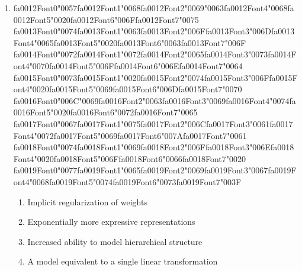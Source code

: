 \documentclass[12pt]{article}
\begin{document}
\begin{enumerate}[label=Q\arabic*.]
 \item {\csname fa0012Font0\endcsname\char"0057}{\csname fa0012Font1\endcsname\char"0068}{\csname fa0012Font2\endcsname\char"0069}{\char"0063}{\csname fa0012Font4\endcsname\char"0068}{\csname fa0012Font5\endcsname\char"0020}{\csname fa0012Font6\endcsname\char"006F}{\csname fa0012Font7\endcsname\char"0075} {\csname fa0013Font0\endcsname\char"0074}{\csname fa0013Font1\endcsname\char"0063}{\csname fa0013Font2\endcsname\char"006F}{\csname fa0013Font3\endcsname\char"006D}{\csname fa0013Font4\endcsname\char"0065}{\csname fa0013Font5\endcsname\char"0020}{\csname fa0013Font6\endcsname\char"0063}{\csname fa0013Font7\endcsname\char"006F} {\csname fa0014Font0\endcsname\char"0072}{\csname fa0014Font1\endcsname\char"0072}{\csname fa0014Font2\endcsname\char"0065}{\csname fa0014Font3\endcsname\char"0073}{\csname fa0014Font4\endcsname\char"0070}{\csname fa0014Font5\endcsname\char"006F}{\csname fa0014Font6\endcsname\char"006E}{\csname fa0014Font7\endcsname\char"0064} {\csname fa0015Font0\endcsname\char"0073}{\csname fa0015Font1\endcsname\char"0020}{\csname fa0015Font2\endcsname\char"0074}{\csname fa0015Font3\endcsname\char"006F}{\csname fa0015Font4\endcsname\char"0020}{\csname fa0015Font5\endcsname\char"0069}{\csname fa0015Font6\endcsname\char"006D}{\csname fa0015Font7\endcsname\char"0070} {\csname fa0016Font0\endcsname\char"006C}{\char"0069}{\csname fa0016Font2\endcsname\char"0063}{\csname fa0016Font3\endcsname\char"0069}{\csname fa0016Font4\endcsname\char"0074}{\csname fa0016Font5\endcsname\char"0020}{\csname fa0016Font6\endcsname\char"0072}{\csname fa0016Font7\endcsname\char"0065} {\csname fa0017Font0\endcsname\char"0067}{\csname fa0017Font1\endcsname\char"0075}{\csname fa0017Font2\endcsname\char"006C}{\csname fa0017Font3\endcsname\char"0061}{\csname fa0017Font4\endcsname\char"0072}{\csname fa0017Font5\endcsname\char"0069}{\csname fa0017Font6\endcsname\char"007A}{\csname fa0017Font7\endcsname\char"0061} {\csname fa0018Font0\endcsname\char"0074}{\csname fa0018Font1\endcsname\char"0069}{\csname fa0018Font2\endcsname\char"006F}{\csname fa0018Font3\endcsname\char"006E}{\csname fa0018Font4\endcsname\char"0020}{\csname fa0018Font5\endcsname\char"006F}{\csname fa0018Font6\endcsname\char"0066}{\csname fa0018Font7\endcsname\char"0020} {\csname fa0019Font0\endcsname\char"0077}{\csname fa0019Font1\endcsname\char"0065}{\csname fa0019Font2\endcsname\char"0069}{\csname fa0019Font3\endcsname\char"0067}{\csname fa0019Font4\endcsname\char"0068}{\csname fa0019Font5\endcsname\char"0074}{\csname fa0019Font6\endcsname\char"0073}{\csname fa0019Font7\endcsname\char"003F}
 \begin{enumerate}[label=(\Alph*)]
     \item Implicit regularization of weights
     \item Exponentially more expressive representations
     \item Increased ability to model hierarchical structure
     \item A model equivalent to a single linear transformation
 \end{enumerate}
 

\end{enumerate}
\end{document}
